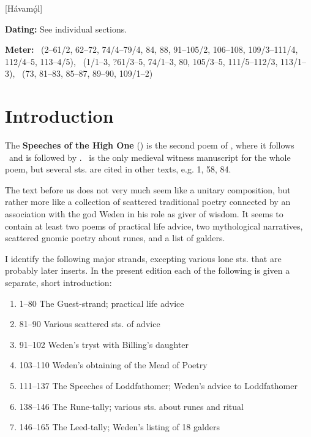 [Hávamǫ́l]
\def\thisBookCode{Havamal}

\begin{flushright}%
\textbf{Dating:} See individual sections.

\textbf{Meter:} \Ljodahattr\ (2–61/2, 62–72, 74/4–79/4, 84, 88, 91–105/2, 106–108, 109/3–111/4, 112/4–5, 113–4/5), \Galdralag\ (1/1–3, ?61/3–5, 74/1–3, 80, 105/3–5, 111/5–112/3, 113/1–3), \Malahattr\ (73, 81–83, 85–87, 89–90, 109/1–2)
\end{flushright}%

\section{Introduction}

The \textbf{Speeches of the High One} (\Havamal) is the second poem of \Regius, where it follows \Voluspa\ and is followed by \Vafthrudnismal.  \Regius\ is the only medieval witness manuscript for the whole poem, but several sts. are cited in other texts, e.g. 1, 58, 84.

The text before us does not very much seem like a unitary composition, but rather more like a collection of scattered traditional poetry connected by an association with the god Weden in his role as giver of wisdom.  It seems to contain at least two poems of practical life advice, two mythological narratives, scattered gnomic poetry about runes, and a list of galders.

I identify the following major strands, excepting various lone sts. that are probably later inserts.  In the present edition each of the following is given a separate, short introduction:

\begin{enumerate}
	\item 1–80 The Guest-strand; practical life advice
  \item 81–90 Various scattered sts. of advice
  \item 91–102 Weden’s tryst with Billing’s daughter
  \item 103–110 Weden’s obtaining of the Mead of Poetry
  \item 111–137 The Speeches of Loddfathomer; Weden’s advice to Loddfathomer
  \item 138–146 The Rune-tally; various sts. about runes and ritual
  \item 146–165 The Leed-tally; Weden’s listing of 18 galders
\end{enumerate}

